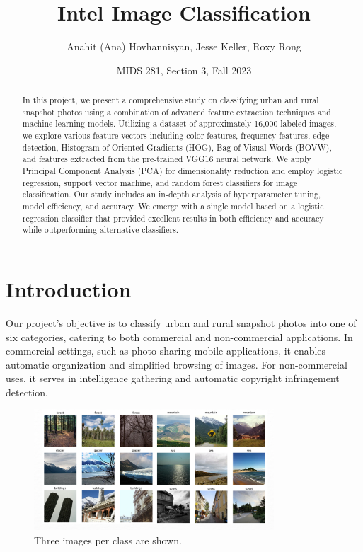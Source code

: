 \documentclass[11pt]{article}
\title{Intel Image Classification}
\author{Anahit (Ana) Hovhannisyan, Jesse Keller, Roxy Rong}
\date{MIDS 281, Section 3, Fall 2023}
\begin{document}
\maketitle
\begin{abstract}%
In this project, we present a comprehensive study on classifying urban and rural snapshot photos using a combination of advanced feature extraction techniques and machine learning models. Utilizing a dataset of approximately 16,000 labeled images, we explore various feature vectors including color features, frequency features, edge detection, Histogram of Oriented Gradients (HOG), Bag of Visual Words (BOVW), and features extracted from the pre-trained VGG16 neural network. We apply Principal Component Analysis (PCA) for dimensionality reduction and employ logistic regression, support vector machine, and random forest classifiers for image classification. Our study includes an in-depth analysis of hyperparameter tuning, model efficiency, and accuracy. We emerge with a single model based on a logistic regression classifier that provided excellent results in both efficiency and accuracy while outperforming alternative classifiers. 
\end{abstract}

\section{Introduction}

Our project's objective is to classify urban and rural snapshot photos into one of six categories, catering to both commercial and non-commercial applications. In commercial settings, such as photo-sharing mobile applications, it enables automatic organization and simplified browsing of images. For non-commercial uses, it serves in intelligence gathering and automatic copyright infringement detection.

\begin{figure}[h!]
\centering
\includegraphics[width=0.8\textwidth]{sample_category.png}
\caption{Three images per class are shown.}
\label{fig:sample categories}
\end{figure}
\end{document}
